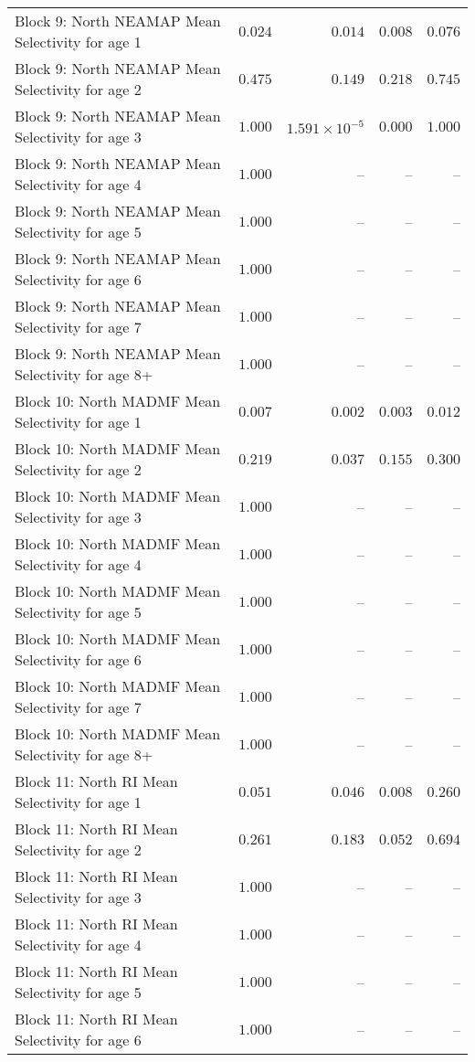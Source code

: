 \documentclass[
]{article}
\begin{document}
\begin{landscape}
\begin{longtable}[t]{lrrrr}
Block 9: North NEAMAP Mean Selectivity for age 1 & $0.024$ & $0.014$ & $0.008$ & $0.076$\\
Block 9: North NEAMAP Mean Selectivity for age 2 & $0.475$ & $0.149$ & $0.218$ & $0.745$\\
Block 9: North NEAMAP Mean Selectivity for age 3 & $1.000$ & $1.591\times 10^{-5}$ & $0.000$ & $1.000$\\
Block 9: North NEAMAP Mean Selectivity for age 4 & $1.000$ & -- & -- & --\\
\addlinespace
Block 9: North NEAMAP Mean Selectivity for age 5 & $1.000$ & -- & -- & --\\
Block 9: North NEAMAP Mean Selectivity for age 6 & $1.000$ & -- & -- & --\\
Block 9: North NEAMAP Mean Selectivity for age 7 & $1.000$ & -- & -- & --\\
Block 9: North NEAMAP Mean Selectivity for age 8+ & $1.000$ & -- & -- & --\\
Block 10: North MADMF Mean Selectivity for age 1 & $0.007$ & $0.002$ & $0.003$ & $0.012$\\
\addlinespace
Block 10: North MADMF Mean Selectivity for age 2 & $0.219$ & $0.037$ & $0.155$ & $0.300$\\
Block 10: North MADMF Mean Selectivity for age 3 & $1.000$ & -- & -- & --\\
Block 10: North MADMF Mean Selectivity for age 4 & $1.000$ & -- & -- & --\\
Block 10: North MADMF Mean Selectivity for age 5 & $1.000$ & -- & -- & --\\
Block 10: North MADMF Mean Selectivity for age 6 & $1.000$ & -- & -- & --\\
\addlinespace
Block 10: North MADMF Mean Selectivity for age 7 & $1.000$ & -- & -- & --\\
Block 10: North MADMF Mean Selectivity for age 8+ & $1.000$ & -- & -- & --\\
Block 11: North RI Mean Selectivity for age 1 & $0.051$ & $0.046$ & $0.008$ & $0.260$\\
Block 11: North RI Mean Selectivity for age 2 & $0.261$ & $0.183$ & $0.052$ & $0.694$\\
Block 11: North RI Mean Selectivity for age 3 & $1.000$ & -- & -- & --\\
\addlinespace
Block 11: North RI Mean Selectivity for age 4 & $1.000$ & -- & -- & --\\
Block 11: North RI Mean Selectivity for age 5 & $1.000$ & -- & -- & --\\
Block 11: North RI Mean Selectivity for age 6 & $1.000$ & -- & -- & --\\

\end{longtable}
\end{landscape}
\end{document}
